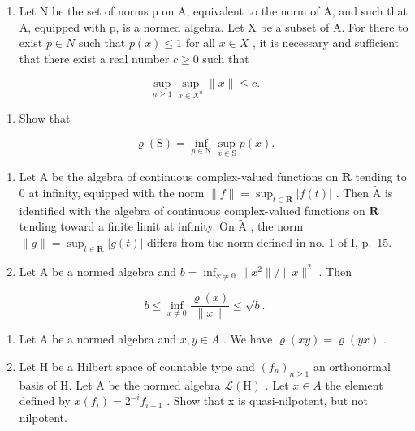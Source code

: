\begin{enumerate}
\def\labelenumi{\alph{enumi})}
\setcounter{enumi}{1}
\tightlist
\item
  Let N be the set of norms p on A, equivalent to the norm of A, and such that A, equipped with p, is a normed algebra. Let X be a subset of A. For there to exist \(p \in N\) such that \(p(x) \leqslant 1\) for all \(x \in X\) , it is necessary and sufficient that there exist a real number \(c \geqslant 0\) such that
\end{enumerate}

\[
\sup _ {n \geqslant 1} \sup _ {x \in X ^ {n}} \| x \| \leqslant c.
\]

\begin{enumerate}
\def\labelenumi{\alph{enumi})}
\setcounter{enumi}{2}
\tightlist
\item
  Show that
\end{enumerate}

\[
\varrho (\mathrm{S}) = \inf _ {p \in \mathrm{N}} \sup _ {x \in \mathrm{S}} p (x).
\]

\begin{enumerate}
\def\labelenumi{\arabic{enumi})}
\setcounter{enumi}{7}
\item
  Let A be the algebra of continuous complex-valued functions on \(\mathbf{R}\) tending to 0 at infinity, equipped with the norm \(\|f\| = \sup_{t\in\mathbf{R}} |f(t)|\) . Then \(\widetilde{\mathrm{A}}\) is identified with the algebra of continuous complex-valued functions on \(\mathbf{R}\) tending toward a finite limit at infinity. On \(\widetilde{\mathrm{A}}\) , the norm \(\|g\| = \sup_{t\in\mathbf{R}} |g(t)|\) differs from the norm defined in no. 1 of I, p.~15.
\item
  Let A be a normed algebra and \(b = \inf_{x \neq 0} \|x^{2}\|/\|x\|^{2}\) . Then
\end{enumerate}

\[
b \leqslant \inf _ {x \neq 0} \frac {\varrho (x)}{\| x \|} \leqslant \sqrt {b}.
\]

\begin{enumerate}
\def\labelenumi{\arabic{enumi})}
\setcounter{enumi}{9}
\item
  Let A be a normed algebra and \(x, y \in A\) . We have \(\varrho(xy) = \varrho(yx)\) .
\item
  Let H be a Hilbert space of countable type and \((f_{n})_{n\geqslant1}\) an orthonormal basis of H. Let A be the normed algebra \(\mathcal{L}(\mathrm{H})\) . Let \(x\in A\) the element defined by \(x(f_{i})=2^{-i}f_{i+1}\) . Show that x is quasi-nilpotent, but not nilpotent.
\end{enumerate}

